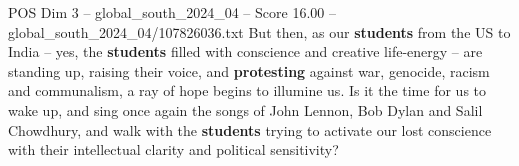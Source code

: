 \begin{textsample}{POS Dim 3 – global\_south\_2024\_04 – Score 16.00 – global\_south\_2024\_04/107826036.txt}
But then, as our \textbf{students} from the US to India -- yes, the \textbf{students} filled with conscience and creative life-energy -- are standing up, raising their voice, and \textbf{protesting} against war, genocide, racism and communalism, a ray of hope begins to illumine us.
Is it the time for us to wake up, and sing once again the songs of John Lennon, Bob Dylan and Salil Chowdhury, and walk with the \textbf{students} trying to activate our lost conscience with their intellectual clarity and political sensitivity?

\end{textsample}
